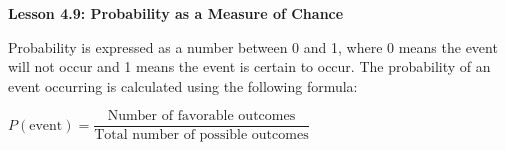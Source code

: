  \begin{center}
\textbf{Lesson 4.9: Probability as a Measure of Chance}
\end{center}

\vspace*{-1ex}

Probability is expressed as a number between 0 and 1, where 0 means the event will not occur and 1 means the event is certain to occur. The probability of an event occurring is calculated using the following formula:

{\centering $ P(\text{event}) = \dfrac{\text{Number of favorable outcomes}}{\text{Total number of possible outcomes}} $\par}


